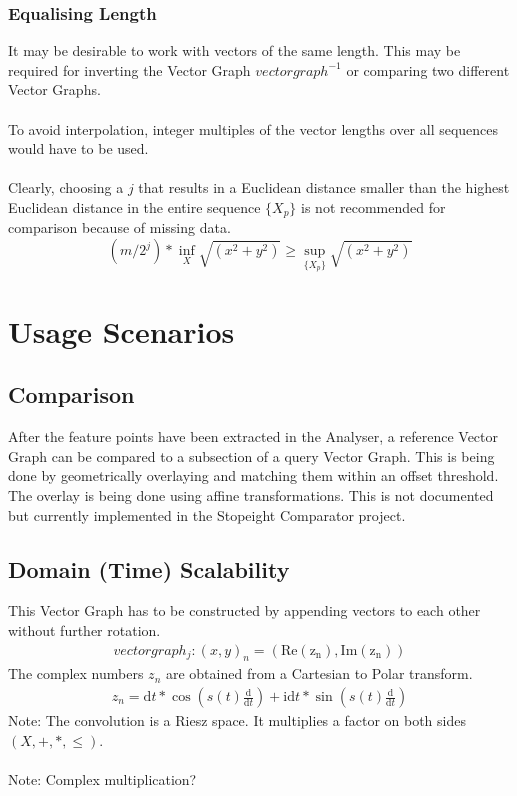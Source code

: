 \documentclass{report}
\begin{document}
\subsection{Equalising Length}
It may be desirable to work with vectors of the same length. This may be required for inverting the Vector Graph $vectorgraph^{-1}$ or comparing two different Vector Graphs.\\\\
To avoid interpolation, integer multiples of the vector lengths over all sequences would have to be used.\\\\
Clearly, choosing a $j$ that results in a Euclidean distance smaller than the highest Euclidean distance in the entire sequence $\{X_{p}\}$ is not recommended for comparison because of missing data.
\begin{equation}
(m/2^j)*\inf \limits _{X} \sqrt{(x^2+y^2)} \geq \sup \limits _{\{X_{p}\}} \sqrt{(x^2+y^2)}
\end{equation}

\chapter{Usage Scenarios}
\section{Comparison}
After the feature points have been extracted in the Analyser, a reference Vector Graph can be compared to a subsection of a query Vector Graph. This is being done by geometrically overlaying and matching them within an offset threshold. The overlay is being done using affine transformations. This is not documented but currently implemented in the Stopeight Comparator project.
\section{Domain (Time) Scalability}
This Vector Graph has to be constructed by appending vectors to each other without further rotation.
\begin{align}
vectorgraph_{j}: (x,y)_{n}=(\mathrm{Re(z_{n})},\mathrm{Im(z_{n})})
\end{align}
The complex numbers $z_{n}$ are obtained from a Cartesian to Polar transform.
\begin{align}
z_{n}= \mathrm{d}t*\cos(s(t)\frac{\mathrm{d}}{\mathrm{d}t}) + \mathrm{i}\mathrm{d}t*\sin(s(t)\frac{\mathrm{d}}{\mathrm{d}t})
\end{align}
Note: The convolution is a Riesz space. It multiplies a factor on both sides $(X,+,*,\leq)$.\\\\
Note: Complex multiplication?\\\\
\end{document}
